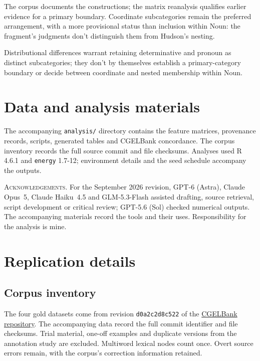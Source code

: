 \documentclass[12pt]{article}
\begin{document}
The corpus documents the constructions; the matrix reanalysis qualifies earlier evidence for a primary boundary. Coordinate subcategories remain the preferred arrangement, with a more provisional status than inclusion within Noun: the fragment's judgments don't distinguish them from Hudson's nesting.

Distributional differences warrant retaining determinative and pronoun as distinct subcategories; they don't by themselves establish a primary-category boundary or decide between coordinate and nested membership within Noun.

\section*{Data and analysis materials}

The accompanying \texttt{analysis/} directory contains the feature matrices, provenance records, scripts, generated tables and CGELBank concordance. The corpus inventory records the full source commit and file checksums. Analyses used R 4.6.1 and \texttt{energy} 1.7-12; environment details and the seed schedule accompany the outputs.

\vspace{0.5\baselineskip}
\noindent\textsc{Acknowledgements.} For the September 2026 revision, GPT-6 (Astra), Claude Opus~5, Claude Haiku~4.5 and GLM-5.3-Flash assisted drafting, source retrieval, script development or critical review; GPT-5.6 (Sol) checked numerical outputs. The accompanying materials record the tools and their uses. Responsibility for the analysis is mine.

\appendix
\section{Replication details}\label{app:replication}

\subsection{Corpus inventory}

The four gold datasets come from revision \texttt{d0a2c2d8c522} of the \href{https://github.com/nert-nlp/cgel}{CGELBank repository}. The accompanying data record the full commit identifier and file checksums. Trial material, one-off examples and duplicate versions from the annotation study are excluded. Multiword lexical nodes count once. Overt source errors remain, with the corpus's correction information retained.
\end{document}
